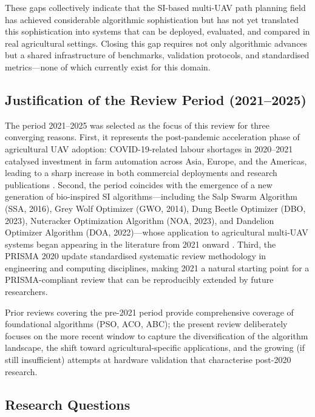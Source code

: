 \documentclass[review,3p,times]{elsarticle}
\begin{document}
These gaps collectively indicate that the SI-based multi-UAV path planning field has achieved considerable algorithmic sophistication but has not yet translated this sophistication into systems that can be deployed, evaluated, and compared in real agricultural settings. Closing this gap requires not only algorithmic advances but a shared infrastructure of benchmarks, validation protocols, and standardised metrics---none of which currently exist for this domain.

\subsection{Justification of the Review Period (2021--2025)}

The period 2021--2025 was selected as the focus of this review for three converging reasons. First, it represents the post-pandemic acceleration phase of agricultural UAV adoption: COVID-19-related labour shortages in 2020--2021 catalysed investment in farm automation across Asia, Europe, and the Americas, leading to a sharp increase in both commercial deployments and research publications \cite{tsouros2019,mogili2018}. Second, the period coincides with the emergence of a new generation of bio-inspired SI algorithms---including the Salp Swarm Algorithm (SSA, 2016), Grey Wolf Optimizer (GWO, 2014), Dung Beetle Optimizer (DBO, 2023), Nutcracker Optimization Algorithm (NOA, 2023), and Dandelion Optimizer Algorithm (DOA, 2022)---whose application to agricultural multi-UAV systems began appearing in the literature from 2021 onward \cite{li2023,xiao2025}. Third, the PRISMA 2020 update \cite{page2021} standardised systematic review methodology in engineering and computing disciplines, making 2021 a natural starting point for a PRISMA-compliant review that can be reproducibly extended by future researchers.

Prior reviews covering the pre-2021 period \cite{chung2018,puente2022,sharma2022,aitsaadi2022} provide comprehensive coverage of foundational algorithms (PSO, ACO, ABC); the present review deliberately focuses on the more recent window to capture the diversification of the algorithm landscape, the shift toward agricultural-specific applications, and the growing (if still insufficient) attempts at hardware validation that characterise post-2020 research.

\subsection{Research Questions}
\end{document}
